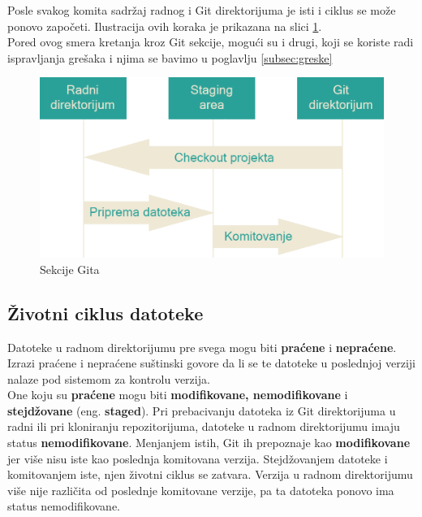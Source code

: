 \documentclass[a4paper]{article}
\begin{document}
{Posle svakog komita sadržaj radnog i Git direktorijuma je isti i ciklus se može ponovo započeti. Ilustracija ovih koraka je prikazana na slici \ref{fig:git_sekcije}.\\
Pored ovog smera kretanja kroz Git sekcije, mogući su i drugi, koji se koriste radi ispravljanja grešaka i njima se bavimo u poglavlju \ref{subsec:greske}

\begin{figure}[h!]
\begin{center}
\includegraphics[scale=0.19]{images/sekcije.png}
\end{center}
\caption{Sekcije Gita}
\label{fig:git_sekcije}
\end{figure}



\subsection{Životni ciklus datoteke}
\label{subsec:ciklus}
Datoteke u radnom direktorijumu pre svega mogu biti \textbf{praćene} i \textbf{nepraćene}. Izrazi praćene i nepraćene suštinski govore da li se te datoteke u poslednjoj verziji nalaze pod sistemom za kontrolu verzija.\\

One koju su \textbf{praćene} mogu biti \textbf{modifikovane, nemodifikovane} i \textbf{stejdžovane }(eng. \textbf{staged}). Pri prebacivanju datoteka iz Git direktorijuma u radni ili pri kloniranju repozitorijuma, datoteke u radnom direktorijumu imaju status \textbf{nemodifikovane}. Menjanjem istih, Git ih prepoznaje kao \textbf{modifikovane} jer više nisu iste kao poslednja komitovana verzija. Stejdžovanjem datoteke i komitovanjem iste, njen životni ciklus se zatvara. Verzija u radnom direktorijumu više nije različita od poslednje komitovane verzije, pa ta datoteka ponovo ima status nemodifikovane.\\

}
\end{document}
